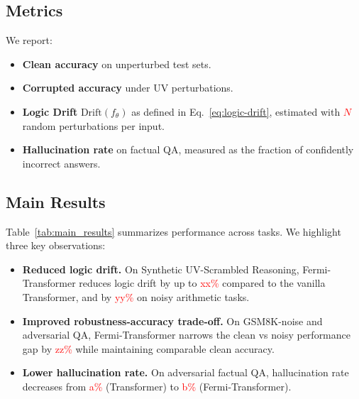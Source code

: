 \documentclass{article}
\newcommand{\TODO}[1]{\textcolor{red}{#1}}
\begin{document}
\subsection{Metrics}

We report:

\begin{itemize}[leftmargin=*]
    \item \textbf{Clean accuracy} on unperturbed test sets.
    \item \textbf{Corrupted accuracy} under UV perturbations.
    \item \textbf{Logic Drift} $\mathrm{Drift}(f_\theta)$ as defined in Eq.~\eqref{eq:logic-drift}, estimated with \TODO{$N$} random perturbations per input.
    \item \textbf{Hallucination rate} on factual QA, measured as the fraction of confidently incorrect answers.
\end{itemize}

\subsection{Main Results}

Table~\ref{tab:main_results} summarizes performance across tasks. We highlight three key observations:

\begin{itemize}[leftmargin=*]
    \item \textbf{Reduced logic drift.} On Synthetic UV-Scrambled Reasoning, Fermi-Transformer reduces logic drift by up to \TODO{xx\%} compared to the vanilla Transformer, and by \TODO{yy\%} on noisy arithmetic tasks.
    \item \textbf{Improved robustness-accuracy trade-off.} On GSM8K-noise and adversarial QA, Fermi-Transformer narrows the clean vs noisy performance gap by \TODO{zz\%} while maintaining comparable clean accuracy.
    \item \textbf{Lower hallucination rate.} On adversarial factual QA, hallucination rate decreases from \TODO{a\%} (Transformer) to \TODO{b\%} (Fermi-Transformer).
\end{itemize}
\end{document}
